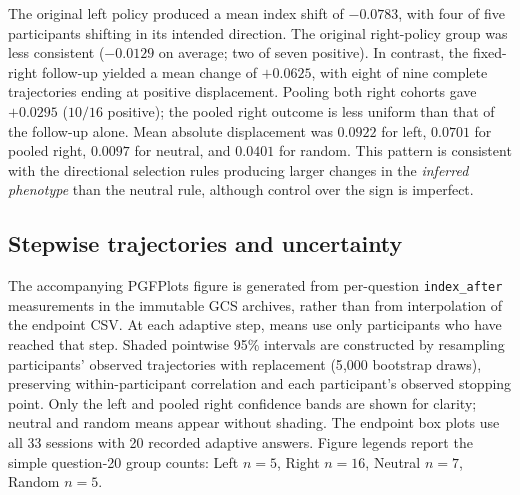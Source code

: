 The original left policy produced a mean index shift of $-0.0783$,
with four of five participants shifting in its intended direction.
The original right-policy group was less consistent ($-0.0129$ on average;
two of seven positive). In contrast, the fixed-right follow-up yielded a
mean change of $+0.0625$, with eight of nine complete trajectories ending at
positive displacement. Pooling both right cohorts gave $+0.0295$ ($10/16$
positive); the pooled right outcome is less uniform than that of the
follow-up alone. Mean absolute displacement was $0.0922$ for left,
$0.0701$ for pooled right, $0.0097$ for neutral, and $0.0401$ for random.
This pattern is consistent with the directional selection rules producing
larger changes in the \emph{inferred phenotype} than the neutral rule,
although control over the sign is imperfect.

\subsection{Stepwise trajectories and uncertainty}
The accompanying PGFPlots figure is generated from per-question
\texttt{index\_after} measurements in the immutable GCS archives, rather than
from interpolation of the endpoint CSV. At each adaptive step, means use
only participants who have reached that step. Shaded pointwise 95\% intervals
are constructed by resampling participants' observed trajectories with
replacement (5{,}000 bootstrap draws), preserving within-participant
correlation and each participant's observed stopping point. Only the left and
pooled right confidence bands are shown for clarity; neutral and random
means appear without shading. The endpoint box plots use all 33 sessions
with 20 recorded adaptive answers. Figure legends report the simple
question-20 group counts: Left $n=5$, Right $n=16$, Neutral $n=7$,
Random $n=5$.

